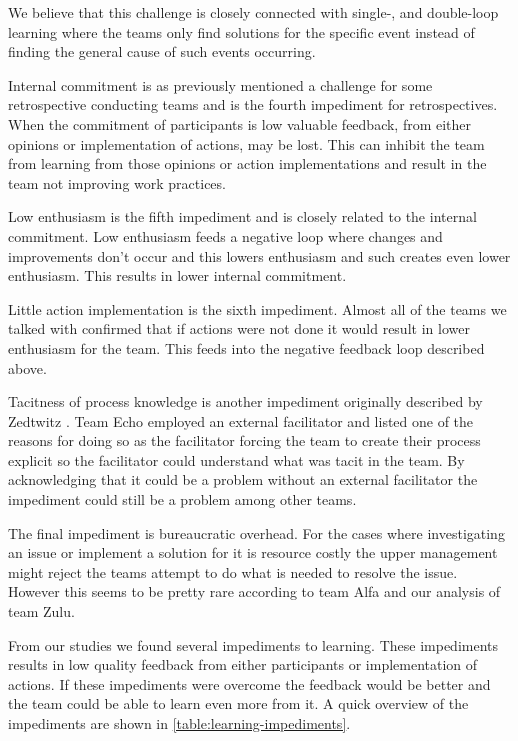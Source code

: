 We believe that this challenge is closely connected with single-, and double-loop learning where the teams only find solutions for the specific event instead of finding the general cause of such events occurring.

Internal commitment is as previously mentioned a challenge for some retrospective conducting teams and is the fourth impediment for retrospectives. When the commitment of participants is low valuable feedback, from either opinions or implementation of actions, may be lost. This can inhibit the team from learning from those opinions or action implementations and result in the team not improving work practices. 

Low enthusiasm is the fifth impediment and is closely related to the internal commitment. Low enthusiasm feeds a negative loop where changes and improvements don't occur and this lowers enthusiasm and such creates even lower enthusiasm. This results in lower internal commitment. 

Little action implementation is the sixth impediment. Almost all of the teams we talked with confirmed that if actions were not done it would result in lower enthusiasm for the team. This feeds into the negative feedback loop described above.

Tacitness of process knowledge is another impediment originally described by Zedtwitz \cite{Zedtwitz2002}. Team Echo employed an external facilitator and listed one of the reasons for doing so as the facilitator forcing the team to create their process explicit so the facilitator could understand what was tacit in the team. By acknowledging that it could be a problem without an external facilitator the impediment could still be a problem among other teams. 

The final impediment is bureaucratic overhead. For the cases where investigating an issue or implement a solution for it is resource costly the upper management might reject the teams attempt to do what is needed to resolve the issue. However this seems to be pretty rare according to team Alfa and our analysis of team Zulu. 

From our studies we found several impediments to learning. These impediments results in low quality feedback from either participants or implementation of actions. If these impediments were overcome the feedback would be better and the team could be able to learn even more from it. A quick overview of the impediments are shown in \autoref{table:learning-impediments}.

